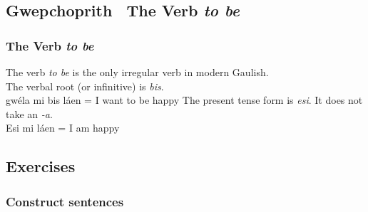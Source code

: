 \subsection{Gwepchoprith \textendash\ The Verb \textit{to be}}
\subsubsection{The Verb \textit{to be}}
The verb \textit{to be} is the only irregular verb in modern Gaulish.\\
The verbal root (or infinitive) is \textit{bis}.\\
gw\'{e}la mi bis l\'{a}en = I want to be happy
The present tense form is \textit{esi}. It does not take an \textit{-a}.\\
Esi mi l\'{a}en = I am happy

\newpage
\subsection{Exercises}

\subsubsection{Construct sentences}

